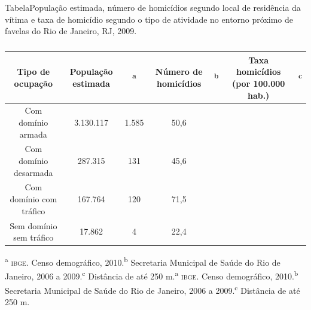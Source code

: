 \documentclass{article}
\begin{document}
TabelaPopulação estimada, número de homicídios segundo local de residência da
vítima e taxa de homicídio segundo o tipo de atividade no entorno próximo de
favelas do Rio de Janeiro, RJ, 2009.\begin{table}
\begin{adjustbox}{width=1.1\textwidth}
\small
\begin{tabulary}{\linewidth}{ C C C C C C C }
\hline
Tipo de ocupação & População estimada &\textsuperscript{a}
& Número de homicídios &\textsuperscript{b}
& Taxa homicídios (por 100.000 hab.) &\textsuperscript{c}
\\ \hline
Com domínio armada
& 3.130.117
& 1.585
& 50,6
\\ \hline

Com domínio desarmada
& 287.315
& 131
& 45,6
\\ \hline

Com domínio com tráfico
& 167.764
& 120
& 71,5
\\ \hline

Sem domínio sem tráfico
& 17.862
& 4
& 22,4
\\ \hline

\end{tabulary}
\end{adjustbox}
\caption{}
\end{table}\textsuperscript{a}
\textsc{ibge}. Censo demográfico, 2010.\textsuperscript{b}
Secretaria Municipal de Saúde do Rio de Janeiro, 2006 a 2009.\textsuperscript{c}
Distância de até 250 m.\textsuperscript{a}
\textsc{ibge}. Censo demográfico, 2010.\textsuperscript{b}
Secretaria Municipal de Saúde do Rio de Janeiro, 2006 a 2009.\textsuperscript{c}
Distância de até 250 m.
\end{document}
